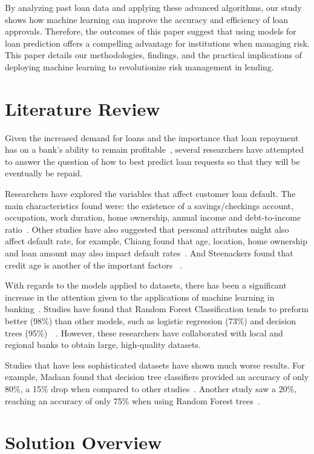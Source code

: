 \documentclass[conference]{IEEEtran}
\begin{document}
By analyzing past loan data and applying these advanced algorithms, our study shows how machine learning can improve the accuracy and efficiency of loan approvals. Therefore, the outcomes of this paper suggest that using models for loan prediction offers a compelling advantage for institutions when managing risk. This paper details our methodologies, findings, and the practical implications of deploying machine learning to revolutionize risk management in lending.

\section{Literature Review}

Given the increased demand for loans and the importance that loan repayment has on a bank's ability to remain profitable~\cite{item2}, several researchers have attempted to answer the question of how to best predict loan requests so that they will be eventually be repaid. 

Researchers have explored the variables that affect customer loan default. The main characteristics found were: the existence of a savings/checkings account, occupation, work duration, home ownership, annual income and debt-to-income ratio~\cite{item3}. Other studies have also suggested that personal attributes might also affect default rate, for example, Chiang found that age, location, home ownership and loan amount may also impact default rates~\cite{item4}. And Steenackers found that credit age is another of the important factors ~\cite{item5}.

With regards to the models applied to datasets, there has been a significant increase in the attention given to the applications of machine learning in banking~\cite{item6}. Studies have found that Random Forest Classification tends to preform better (98\%) than other models, such as logistic regression (73\%) and decision trees (95\%)~\cite{item7}~\cite{item8}. However, these researchers have collaborated with local and regional banks to obtain large, high-quality datasets. 

Studies that have less sophisticated datasets have shown much worse results. For example, Madaan found that decision tree classifiers provided an accuracy of only 80\%, a 15\% drop when compared to other studies~\cite{item9}. Another study saw a 20\%, reaching an accuracy of only 75\% when using Random Forest trees~\cite{item10}.



\section{Solution Overview}
\end{document}
